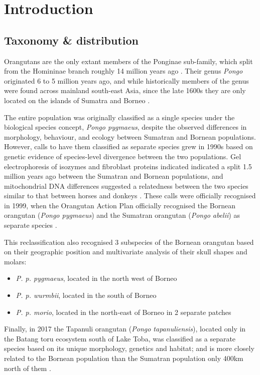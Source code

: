 \section{Introduction}
\subsection{Taxonomy \& distribution}

Orangutans are the only extant members of the Ponginae sub-family, which split from the Homininae branch roughly 14 million years ago \citep{Grabowski.2017}. Their genus \textit{Pongo} originated 6 to 5 million years ago, and while historically members of the genus were found across mainland south-east Asia, since the late 1600s they are only located on the islands of Sumatra and Borneo \citep{Spehar.2018}.

The entire population was originally classified as a single species under the biological species concept, \textit{ Pongo pygmaeus}, despite the observed differences in morphology, behaviour, and ecology between Sumatran and Bornean populations. However, calls to have them classified as separate species grew in 1990s based on genetic evidence of species-level divergence between the two populations. Gel electrophoresis of isozymes and fibroblast proteins indicated indicated a split 1.5 million years ago between the Sumatran and Bornean populations, and mitochondrial DNA differences suggested a relatedness between the two species similar to that between horses and donkeys \citep{Janczewski.1990,Xu.1996}. These calls were officially recognised in 1999, when the Orangutan Action Plan officially recognised the Bornean orangutan (\textit{Pongo pygmaeus}) and the Sumatran orangutan (\textit{Pongo abelii}) as separate species \citep{Groves.1999}. 

This reclassification also recognised 3 subspecies of the Bornean orangutan based on their geographic position and multivariate analysis of their skull shapes and molars: 
\begin{itemize}
\item \textit{P. p. pygmaeus}, located in the north west of Borneo
\item \textit{P. p. wurmbii}, located in the south of Borneo
\item \textit{P. p. morio}, located in the north-east of Borneo in 2 separate patches
\end{itemize}

Finally, in 2017 the Tapanuli orangutan (\textit{Pongo tapanuliensis}), located only in the Batang toru ecosystem south of Lake Toba, was classified as a separate species based on its unique morphology, genetics and habitat; and is more closely related to the Bornean population than the Sumatran population only 400km north of them \citep{Nater.2017}. 

